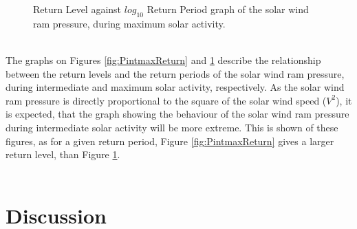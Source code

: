 \documentclass[12pt]{article}
\begin{document}
\begin{figure}[t!]
\begin{minipage}{0.48\textwidth}
                \caption{Return Level against $log_{10}$ Return Period graph of the solar wind ram pressure, during maximum solar activity.}
                \label{fig:PmaxmaxReturn}
            \end{minipage}
        \end{figure}\\
        The graphs on Figures \ref{fig:PintmaxReturn} and \ref{fig:PmaxmaxReturn} describe the relationship between the return levels and the return periods of the solar wind ram pressure, during intermediate and maximum solar activity, respectively. As the solar wind ram pressure is directly proportional to the square of the solar wind speed ($V^2$), it is expected, that the graph showing the behaviour of the solar wind ram pressure during intermediate solar activity will be more extreme. This is shown of these figures, as for a given return period, Figure \ref{fig:PintmaxReturn} gives a larger return level, than Figure \ref{fig:PmaxmaxReturn}.\\ \\
\section{Discussion}\label{sec:discussion}
\end{document}
